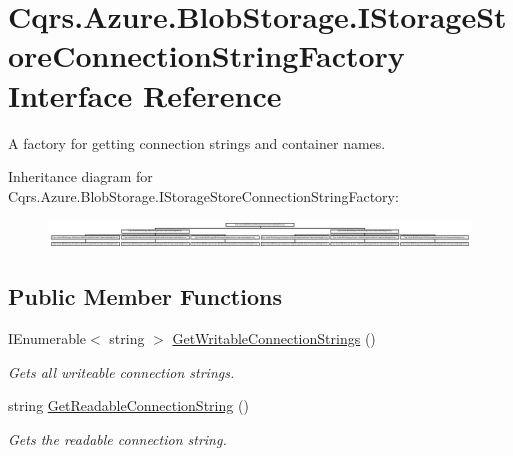 \hypertarget{interfaceCqrs_1_1Azure_1_1BlobStorage_1_1IStorageStoreConnectionStringFactory}{}\section{Cqrs.\+Azure.\+Blob\+Storage.\+I\+Storage\+Store\+Connection\+String\+Factory Interface Reference}
\label{interfaceCqrs_1_1Azure_1_1BlobStorage_1_1IStorageStoreConnectionStringFactory}


A factory for getting connection strings and container names.  


Inheritance diagram for Cqrs.\+Azure.\+Blob\+Storage.\+I\+Storage\+Store\+Connection\+String\+Factory\+:\begin{figure}[H]
\begin{center}
\leavevmode
\includegraphics[height=0.743692cm]{interfaceCqrs_1_1Azure_1_1BlobStorage_1_1IStorageStoreConnectionStringFactory}
\end{center}
\end{figure}
\subsection*{Public Member Functions}
\begin{DoxyCompactItemize}
\item 
I\+Enumerable$<$ string $>$ \hyperlink{interfaceCqrs_1_1Azure_1_1BlobStorage_1_1IStorageStoreConnectionStringFactory_a26ecfd0805fe3d525e9fa419330bd140_a26ecfd0805fe3d525e9fa419330bd140}{Get\+Writable\+Connection\+Strings} ()
\begin{DoxyCompactList}\small\item\em Gets all writeable connection strings. \end{DoxyCompactList}\item 
string \hyperlink{interfaceCqrs_1_1Azure_1_1BlobStorage_1_1IStorageStoreConnectionStringFactory_a0ed836289e048767f753630bbcc98d5d_a0ed836289e048767f753630bbcc98d5d}{Get\+Readable\+Connection\+String} ()
\begin{DoxyCompactList}\small\item\em Gets the readable connection string. \end{DoxyCompactList}\end{DoxyCompactItemize}


